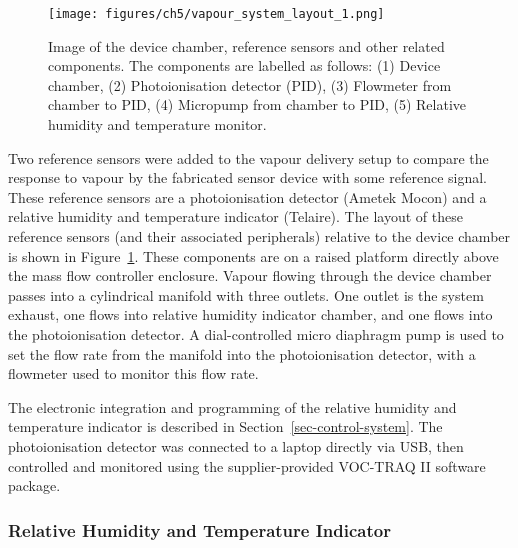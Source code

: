 \documentclass[
  a4paper,
]{scrbook}
\begin{document}
\begin{figure}

{\centering \texttt{[image: figures/ch5/vapour\_system\_layout\_1.png]}

}

\caption{\label{fig-reference-sensor-layout}Image of the device chamber,
reference sensors and other related components. The components are
labelled as follows: (1) Device chamber, (2) Photoionisation detector
(PID), (3) Flowmeter from chamber to PID, (4) Micropump from chamber to
PID, (5) Relative humidity and temperature monitor.}

\end{figure}

Two reference sensors were added to the vapour delivery setup to compare
the response to vapour by the fabricated sensor device with some
reference signal. These reference sensors are a photoionisation detector
(Ametek Mocon) and a relative humidity and temperature indicator
(Telaire). The layout of these reference sensors (and their associated
peripherals) relative to the device chamber is shown in
Figure~\ref{fig-reference-sensor-layout}. These components are on a
raised platform directly above the mass flow controller enclosure.
Vapour flowing through the device chamber passes into a cylindrical
manifold with three outlets. One outlet is the system exhaust, one flows
into relative humidity indicator chamber, and one flows into the
photoionisation detector. A dial-controlled micro diaphragm pump is used
to set the flow rate from the manifold into the photoionisation
detector, with a flowmeter used to monitor this flow rate.

The electronic integration and programming of the relative humidity and
temperature indicator is described in Section~\ref{sec-control-system}.
The photoionisation detector was connected to a laptop directly via USB,
then controlled and monitored using the supplier-provided VOC-TRAQ II
software package.

\hypertarget{relative-humidity-and-temperature-indicator}{%
\subsubsection*{Relative Humidity and Temperature
Indicator}\label{relative-humidity-and-temperature-indicator}}
\end{document}
